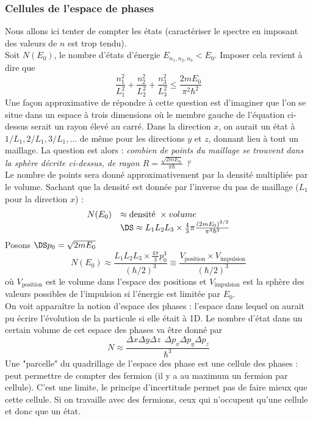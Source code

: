 		
		\subsubsection{Cellules de l'espace de phases}
		Nous allons ici tenter de compter les états (caractériser le spectre en imposant des	valeurs de 
		$n$ est trop tendu).\\
		
		Soit $N(E_0)$, le nombre d'états d'énergie $E_{n_1,n_2,n_3} < E_0$. Imposer cela revient à dire 
		que
		\begin{equation}
		\dfrac{n_1^2}{L_1^2}+\dfrac{n_2^2}{L_2^2}+	\dfrac{n_3^2}{L_3^2} \leq \dfrac{2mE_0}{\pi^2\hbar^2}
		\end{equation}
		Une façon approximative de répondre à cette question est d'imaginer que l'on se situe dans un 
		espace à trois dimensions où le membre gauche de l'équation ci-dessus serait un rayon élevé au 
		carré. Dans la direction $x$, on aurait un état à $1/L_1, 2/L_1, 3/L_1,\dots$ de même pour les 
		directions $y$ et $z$, donnant lieu à tout un maillage. La question est alors : \textit{combien 
		de points du maillage se trouvent dans la sphère décrite ci-dessus, de rayon $R=\frac{\sqrt{2mE_0}}{
		\pi\hbar}$ ?}\\
				
		Le nombre de points sera donné approximativement par la densité multipliée par le volume. Sachant 
		que la densité est donnée par l'inverse du pas de maillage ($L_1$ pour la direction $x$) :
		\begin{equation}
		\begin{array}{ll}
		N(E_0) &\approx \text{densité }\times{ volume}\\
		&\DS\approx L_1L_2L_3 \times \frac{4}{3}\pi\frac{(2mE_0)^{3/2}}{\pi^3\hbar^3}
		\end{array}
		\end{equation}
		Posons $\DS p_0 = \sqrt{2mE_0}$
		\begin{equation}
		N(E_0) \approx \dfrac{L_1L_2L_3\times\frac{4\pi}{3}p_0^3}{(\hbar/2)^3} \equiv \dfrac{V_{\text{position}}
		\times V_{\text{impulsion}}}{(\hbar/2)^3}
		\end{equation}
		où $V_{\text{position}}$ est le volume dans l'espace des positions et $V_{\text{impulsion}}$ est 
		la sphère des valeurs possibles de l'impulsion si l'énergie est limitée par $E_0$.\\
				
		On voit apparaître la notion d'espace des phases : l'espace dans lequel on aurait pu écrire 
		l'évolution de la particule si elle était à 1D. Le nombre d'état dans un certain volume de 
		cet espace des phases va être donné par
		\begin{equation}
		N \approx \dfrac{\Delta x\Delta y\Delta z\ \ \Delta p_x\Delta p_y\Delta p_z}{\hbar^3}
		\end{equation}
		Une "parcelle" du quadrillage de l'espace des phase est une cellule des phases : peut permettre 
		de compter des fermion (il y a au maximum un fermion par cellule). C'est une limite, le principe
		d'incertitude permet pas de faire mieux que cette cellule. Si on travaille avec des fermions, 
		ceux qui n'occupent qu'une cellule et donc que un état.
		
